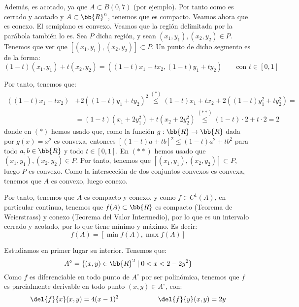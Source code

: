 \begin{ejercicio}
    Además, es acotado, ya que $A\subset B(0, 7)$ (por ejemplo). Por tanto como es cerrado y acotado y $A\subset \bb{R}^n$, tenemos que es compacto. Veamos ahora que es conexo.
    El semiplano es convexo. Veamos que la región delimitada por la parábola también lo es. Sea $P$ dicha región,
    y sean $(x_1,y_1), (x_2,y_2)\in P$. Tenemos que ver que $[(x_1,y_1), (x_2,y_2)]\subset P$.
    Un punto de dicho segmento es de la forma:
    \begin{equation*}
        (1-t)(x_1,y_1)+t(x_2,y_2) = ((1-t)x_1+tx_2, (1-t)y_1+ty_2) \qquad \text{con } t\in [0,1]
    \end{equation*}

    Por tanto, tenemos que:
    \begin{equation*}
        \begin{split}
            \left((1-t)x_1+tx_2\right) &+ 2\left((1-t)y_1+ty_2\right)^2
            \stackrel{(\ast)}{\leq}
            (1-t)x_1+tx_2 + 2\left((1-t)y_1^2 + ty_2^2\right) =
            \\&= (1-t)\left(x_1 + 2y_1^2\right) + t\left(x_2 + 2y_2^2\right)
            \stackrel{(\ast\ast)}{\leq} (1-t)\cdot 2 + t\cdot 2 = 2
        \end{split}
    \end{equation*}
    donde en $(\ast)$ hemos usado que, como la función $g:\bb{R}\to \bb{R}$ dada por $g(x)=x^2$ es convexa, entonces $[(1-t)a + tb]^2 \leq (1-t)a^2 + tb^2$ para todo $a,b\in \bb{R}$ y todo $t\in [0,1]$.
    En $(\ast\ast)$ hemos usado que $(x_1,y_1), (x_2,y_2)\in P$. Por tanto, tenemos que $[(x_1,y_1), (x_2,y_2)]\subset P$, luego $P$ es convexo. Como la intersección de dos conjuntos convexos es convexa, tenemos que $A$ es convexo, luego conexo.

    Por tanto, tenemos que $A$ es compacto y conexo, y como $f\in C^1(A)$, en particular continua, tenemos que
    $f(A)\subset \bb{R}$ es compacto (Teorema de Weierstrass) y conexo (Teorema del Valor Intermedio), por lo que es un intervalo cerrado y acotado, por lo que tiene mínimo y máximo. Es decir:
    \begin{equation*}
        f(A) = [\min f(A), \max f(A)]
    \end{equation*}

    Estudiamos en primer lugar su interior. Tenemos que: $$A^\circ = \{(x,y)\in \bb{R}^2\mid 0< x < 2-2y^2\}$$
    Como $f$ es diferenciable en todo punto de $A^\circ$ por ser polinómica, tenemos que $f$ es parcialmente derivable en todo punto $(x,y)\in A^\circ$, con:
    \begin{equation*}
        \del{f}{x}(x,y) = 4(x-1)^3 \hspace{2cm}
        \del{f}{y}(x,y) = 2y
    \end{equation*}
    

\end{ejercicio}
